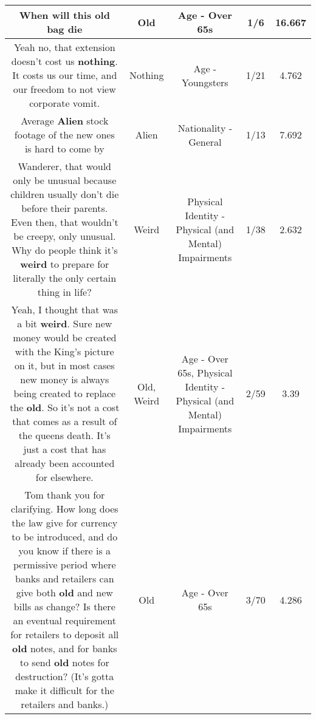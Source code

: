 \documentclass[11pt]{article}
\newlength\mylength
\begin{document}
\begin{center}
\begin{longtable}{|C{.65\mylength}|C{.30\mylength}|C{.12\mylength}|C{.12\mylength}|C{.12\mylength}|}
  \small When will this \textbf{old} bag die\normalsize   & Old & Age - Over 65s & 1/6 & 16.667 \\  \hline
  \small Yeah no, that extension doesn't cost us \textbf{nothing}. It costs us our time, and our freedom to not view corporate vomit.\normalsize   & Nothing & Age - Youngsters & 1/21 & 4.762 \\  \hline
  \small Average \textbf{Alien} stock footage of the new ones is hard to come by\normalsize   & Alien & Nationality - General & 1/13 & 7.692 \\  \hline
  \small Wanderer, that would only be unusual because children usually don't die before their parents. Even then, that wouldn't be creepy, only unusual. Why do people think it's \textbf{weird} to prepare for literally the only certain thing in life?\normalsize   & Weird & Physical Identity - Physical (and Mental) Impairments & 1/38 & 2.632 \\  \hline
  \small Yeah, I thought that was a bit \textbf{weird}. Sure new money would be created with the King's picture on it, but in most cases new money is always being created to replace the \textbf{old}. So it's not a cost that comes as a result of the queens death. It's just a cost that has already been accounted for elsewhere.\normalsize   & Old, Weird & Age - Over 65s, Physical Identity - Physical (and Mental) Impairments & 2/59 & 3.39 \\  \hline
  \small Tom thank you for clarifying. How long does the law give for currency to be introduced, and do you know if there is a permissive period where banks and retailers can give both \textbf{old} and new bills as change? Is there an eventual requirement for retailers to deposit all \textbf{old} notes, and for banks to send \textbf{old} notes for destruction? (It's gotta make it difficult for the retailers and banks.)\normalsize   & Old & Age - Over 65s & 3/70 & 4.286 \\  \hline

\end{longtable}
\end{center}
\end{document}
